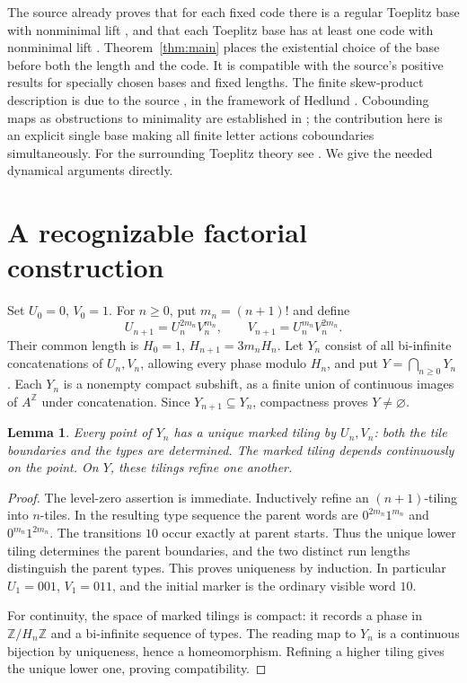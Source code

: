 \documentclass[11pt]{article}
\newtheorem{lemma}[theorem]{Lemma}
\newcommand{\Z}{\mathbb Z}
\begin{document}
The source already proves that for each fixed code there is a regular Toeplitz base with nonminimal lift \cite[Theorem 1.9(b), Proposition 6.12]{KJ}, and that each Toeplitz base has at least one code with nonminimal lift \cite[Theorem 6.11]{KJ}. Theorem~\ref{thm:main} places the existential choice of the base before both the length and the code. It is compatible with the source's positive results for specially chosen bases and fixed lengths.
The finite skew-product description is due to the source \cite[Proposition 1.1, Theorem 1.3]{KJ}, in the framework of Hedlund \cite[Section 6]{Hedlund}. Cobounding maps as obstructions to minimality are established in \cite[Definition 7.3, Proposition 7.4, Theorem 7.5]{Berthe}; the contribution here is an explicit single base making all finite letter actions coboundaries simultaneously. For the surrounding Toeplitz theory see \cite{Downarowicz}. We give the needed dynamical arguments directly.

\section{A recognizable factorial construction}
Set $U_0=0$, $V_0=1$. For $n\geq0$, put $m_n=(n+1)!$ and define
\begin{equation}\label{eq:words}
 U_{n+1}=U_n^{2m_n}V_n^{m_n},\qquad
 V_{n+1}=U_n^{m_n}V_n^{2m_n}.
\end{equation}
Their common length is $H_0=1$, $H_{n+1}=3m_nH_n$. Let $Y_n$ consist of all bi-infinite concatenations of $U_n,V_n$, allowing every phase modulo $H_n$, and put $Y=\bigcap_{n\geq0}Y_n$. Each $Y_n$ is a nonempty compact subshift, as a finite union of continuous images of $A^{\Z}$ under concatenation. Since $Y_{n+1}\subseteq Y_n$, compactness proves $Y\ne\varnothing$.

\begin{lemma}\label{lem:tiling}
Every point of $Y_n$ has a unique marked tiling by $U_n,V_n$: both the tile boundaries and the types are determined. The marked tiling depends continuously on the point. On $Y$, these tilings refine one another.
\end{lemma}
\begin{proof}
The level-zero assertion is immediate. Inductively refine an $(n+1)$-tiling into $n$-tiles. In the resulting type sequence the parent words are $0^{2m_n}1^{m_n}$ and $0^{m_n}1^{2m_n}$. The transitions $10$ occur exactly at parent starts. Thus the unique lower tiling determines the parent boundaries, and the two distinct run lengths distinguish the parent types. This proves uniqueness by induction. In particular $U_1=001$, $V_1=011$, and the initial marker is the ordinary visible word $10$.

For continuity, the space of marked tilings is compact: it records a phase in $\Z/H_n\Z$ and a bi-infinite sequence of types. The reading map to $Y_n$ is a continuous bijection by uniqueness, hence a homeomorphism. Refining a higher tiling gives the unique lower one, proving compatibility.
\end{proof}
\end{document}

